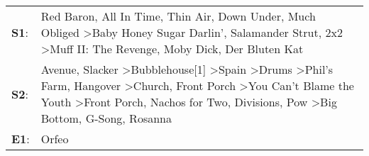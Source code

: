 \begin{supertabular}{p{0.03\textwidth}p{0.92\textwidth}}
 \textbf{S1}:  &                                                                                                                                                                                                                                                                              Red Baron\textsuperscript{}, \enspace All In Time\textsuperscript{}, \enspace Thin Air\textsuperscript{}, \enspace Down Under\textsuperscript{}, \enspace Much Obliged\textsuperscript{} \textgreater \enspace Baby Honey Sugar Darlin'\textsuperscript{}, \enspace Salamander Strut\textsuperscript{}, \enspace 2x2\textsuperscript{} \textgreater \enspace Muff II: The Revenge\textsuperscript{}, \enspace Moby Dick\textsuperscript{}, \enspace Der Bluten Kat\textsuperscript{}  \enspace  \\
 \textbf{S2}:  &  Avenue\textsuperscript{}, \enspace Slacker\textsuperscript{} \textgreater \enspace Bubblehouse[1]\textsuperscript{} \textgreater \enspace Spain\textsuperscript{} \textgreater \enspace Drums\textsuperscript{} \textgreater \enspace Phil's Farm\textsuperscript{}, \enspace Hangover\textsuperscript{} \textgreater \enspace Church\textsuperscript{}, \enspace Front Porch\textsuperscript{} \textgreater \enspace You Can't Blame the Youth\textsuperscript{} \textgreater \enspace Front Porch\textsuperscript{}, \enspace Nachos for Two\textsuperscript{}, \enspace Divisions\textsuperscript{}, \enspace Pow\textsuperscript{} \textgreater \enspace Big Bottom\textsuperscript{}, \enspace G-Song\textsuperscript{}, \enspace Rosanna\textsuperscript{}  \enspace  \\
 \textbf{E1}:  &                                                                                                                                                                                                                                                                                                                                                                                                                                                                                                                                                                                                                                                                                                                                           Orfeo\textsuperscript{}  \enspace  \\
\end{supertabular}
